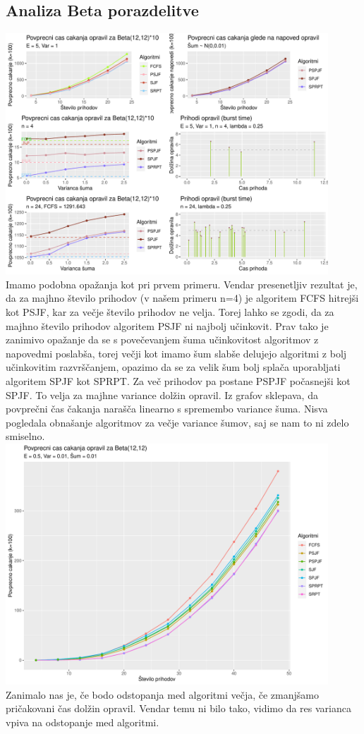\documentclass[a4paper, pt14]{article}
\begin{document}
\subsection{Analiza Beta porazdelitve}
\includegraphics[width=12.1cm,keepaspectratio]{Beta_grafi.pdf}
\\ Imamo podobna opažanja kot pri prvem primeru. Vendar presenetljiv rezultat je, da za majhno število prihodov (v našem primeru n=4) je algoritem FCFS hitrejši kot PSJF, kar za večje število prihodov ne velja. Torej lahko se zgodi, da za majhno število prihodov algoritem PSJF ni najbolj učinkovit. Prav tako je zanimivo opažanje da se s povečevanjem šuma  učinkovitost algoritmov z napovedmi poslabša, torej večji kot imamo šum slabše delujejo algoritmi z bolj učinkovitim razvrščanjem, opazimo da se za velik šum bolj splača uporabljati algoritem SPJF kot SPRPT. Za več prihodov pa postane PSPJF počasnejši kot SPJF. To velja za majhne variance dolžin opravil. Iz grafov sklepava, da povprečni čas čakanja narašča linearno s spremembo variance šuma. Nisva pogledala obnašanje algoritmov za večje variance šumov, saj se nam to ni zdelo smiselno.\\
\includegraphics[width=12.1cm,keepaspectratio]{Beta_grafi_majhna.pdf}
\\
Zanimalo nas je, če bodo odstopanja med algoritmi večja, če zmanjšamo pričakovani čas dolžin opravil. Vendar temu ni bilo tako, vidimo da res varianca vpiva na odstopanje med algoritmi. 
\end{document}

